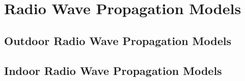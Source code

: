 \section{Radio Wave Propagation Models}
\subsection{Outdoor Radio Wave Propagation Models}
\subsection{Indoor Radio Wave Propagation Models}
\pagebreak

